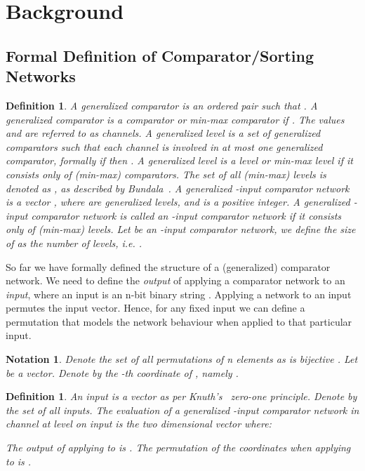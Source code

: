 \documentclass[13pt,a4paper]{article}
\newtheorem{definition}[theorem]{Definition}
\newtheorem{notation}[theorem]{Notation}
\begin{document}
\section{ Background }

\subsection{ Formal Definition of Comparator/Sorting Networks }

\begin{definition}
\label{ComparatorNetworkDefinition}
A \emph{generalized comparator} is an ordered pair  such that . A generalized comparator is a \emph{comparator} or \emph{min-max comparator} if . The values  and  are referred to as \emph{channels}.
A \emph{generalized level}  is a set of generalized comparators such that each channel is involved in at most one generalized comparator, formally if  then . A generalized level is a \emph{level} or \emph{min-max level} if it consists only of (min-max) comparators. The set of all (min-max) levels is denoted as , as described by Bundala~\cite{BundalaCCSZ14_Optimal_Depth}.
A \emph{generalized -input comparator network} is a vector , where  are generalized levels, and  is a positive integer. A generalized -input comparator network is called an \emph{-input comparator network} if it consists only of (min-max) levels. Let  be an -input comparator network, we define the size of  as the number of levels, i.e. .
\end{definition}

So far we have formally defined the structure of a (generalized) comparator network. We need to define the \emph{output} of applying a comparator network to an \emph{input}, where an input is an n-bit binary string \cite{Knuth73}. Applying a network to an input permutes the input vector. Hence, for any fixed input we can define a permutation that models the network behaviour when applied to that particular input.

\begin{notation}
\label{PermutationDefinition}
Denote the set of all permutations of n elements as    is bijective . Let  be a vector. Denote by  the -th coordinate of , namely .
\end{notation}

\begin{definition}
\label{def:ComparatorNetworkEvaluation}
An \emph{input} is a vector  as per Knuth's~\cite{Knuth73} zero-one principle. Denote by  the set of all inputs. The evaluation of a generalized -input comparator network  in channel  at level  on input  is the two dimensional vector  where:



The output of applying  to  is \emph{}. The permutation of the coordinates when applying  to   is \emph{}.
\end{definition}
\end{document}
